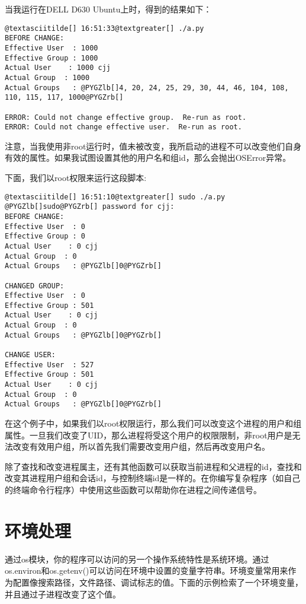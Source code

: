 \documentclass[a4paper,10pt,english]{manual}
\begin{document}
当我运行在DELL D630 Ubuntu上时，得到的结果如下：

\begin{Verbatim}[commandchars=@\[\]]
@textasciitilde[] 16:51:33@textgreater[] ./a.py
BEFORE CHANGE:
Effective User  : 1000
Effective Group : 1000
Actual User    : 1000 cjj
Actual Group  : 1000
Actual Groups   : @PYGZlb[]4, 20, 24, 25, 29, 30, 44, 46, 104, 108, 110, 115, 117, 1000@PYGZrb[]

ERROR: Could not change effective group.  Re-run as root.
ERROR: Could not change effective user.  Re-run as root.
\end{Verbatim}

注意，当我使用非root运行时，值未被改变，我所启动的进程不可以改变他们自身有效的属性。如果我试图设置其他的用户名和组id，那么会抛出OSError异常。

下面，我们以root权限来运行这段脚本:

\begin{Verbatim}[commandchars=@\[\]]
@textasciitilde[] 16:51:10@textgreater[] sudo ./a.py
@PYGZlb[]sudo@PYGZrb[] password for cjj:
BEFORE CHANGE:
Effective User  : 0
Effective Group : 0
Actual User    : 0 cjj
Actual Group  : 0
Actual Groups   : @PYGZlb[]0@PYGZrb[]

CHANGED GROUP:
Effective User  : 0
Effective Group : 501
Actual User    : 0 cjj
Actual Group  : 0
Actual Groups   : @PYGZlb[]0@PYGZrb[]

CHANGE USER:
Effective User  : 527
Effective Group : 501
Actual User    : 0 cjj
Actual Group  : 0
Actual Groups   : @PYGZlb[]0@PYGZrb[]
\end{Verbatim}

在这个例子中，如果我们以root权限运行，那么我们可以改变这个进程的用户和组属性。一旦我们改变了UID，那么进程将受这个用户的权限限制，非root用户是无法改变有效用户组，所以首先我们需要改变用户组，然后再改变用户名。

除了查找和改变进程属主，还有其他函数可以获取当前进程和父进程的id，查找和改变其进程用户组和会话id，与控制终端id是一样的。在你编写复杂程序（如自己的终端命令行程序）中使用这些函数可以帮助你在进程之间传递信号。


\section{环境处理}

通过os模块，你的程序可以访问的另一个操作系统特性是系统环境。通过os.environ和os.getenv()可以访问在环境中设置的变量字符串。环境变量常用来作为配置像搜索路径，文件路径、调试标志的值。下面的示例检索了一个环境变量，并且通过子进程改变了这个值。
\end{document}
